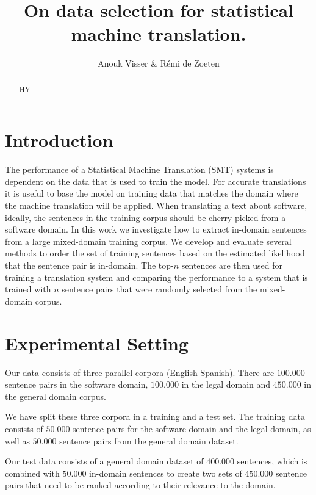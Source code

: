 \documentclass[11pt]{article}
\title{On data selection for statistical machine translation.}
\author{Anouk Visser \& R\'emi de Zoeten}
\date{}
\begin{document}
\maketitle

\begin{abstract}
HY
\end{abstract}

\section{Introduction}
\label{sec:intro}
The performance of a Statistical Machine Translation (SMT) systems is dependent on the data that is used to train the model. For accurate translations it is useful to base the model on training data that matches the domain where the machine translation will be applied. When translating a text about software, ideally, the sentences in the training corpus should be cherry picked from a software domain. 
In this work we investigate how to extract in-domain sentences from a large mixed-domain training corpus. We develop and evaluate several methods to order the set of training sentences based on the estimated likelihood that the sentence pair is in-domain. The top-$n$ sentences are then used for training a translation system and comparing the performance to a system that is trained with $n$ sentence pairs that were randomly selected from the mixed-domain corpus.

\section{Experimental Setting}
Our data consists of three parallel corpora (English-Spanish). There are $100.000$ sentence pairs in the software domain, $100.000$ in the legal domain and $450.000$ in the general domain corpus. 

We have split these three corpora in a training and a test set. The training data consists of $50.000$ sentence pairs for the software domain and the legal domain, as well as $50.000$ sentence pairs from the general domain dataset.

Our test data consists of a general domain dataset of $400.000$ sentences, which is combined with $50.000$ in-domain sentences to create two sets of $450.000$ sentence pairs that need to be ranked according to their relevance to the domain.
\end{document}
